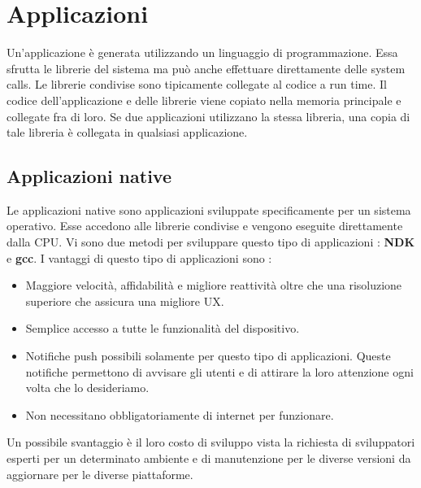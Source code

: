\documentclass[12pt]{report}
\begin{document}
\section{Applicazioni}
Un'applicazione è generata utilizzando un linguaggio di programmazione. Essa sfrutta le librerie del sistema ma può anche effettuare direttamente delle system calls. Le librerie condivise sono tipicamente collegate al codice a run time. Il codice dell'applicazione e delle librerie viene copiato nella memoria principale e collegate fra di loro. Se due applicazioni utilizzano la stessa libreria, una copia di tale libreria è collegata in qualsiasi applicazione.
\subsection{Applicazioni native}
Le applicazioni native sono applicazioni sviluppate specificamente per un sistema operativo. Esse accedono alle librerie condivise e vengono eseguite direttamente dalla CPU. Vi sono due metodi per sviluppare questo tipo di applicazioni : \textbf{NDK} e \textbf{gcc}. I vantaggi di questo tipo di applicazioni sono : 
\begin{itemize}
\item Maggiore velocità, affidabilità e migliore reattività oltre che una risoluzione superiore che assicura una migliore UX.
\item Semplice accesso a tutte le funzionalità del dispositivo.
\item Notifiche push possibili solamente per questo tipo di applicazioni. Queste notifiche permettono di avvisare gli utenti e di attirare la loro attenzione ogni volta che lo desideriamo.
\item Non necessitano obbligatoriamente di internet per funzionare.
\end{itemize}
Un possibile svantaggio è il loro costo di sviluppo vista la richiesta di sviluppatori esperti per un determinato ambiente e di manutenzione per le diverse versioni da aggiornare per le diverse piattaforme.
\end{document}
